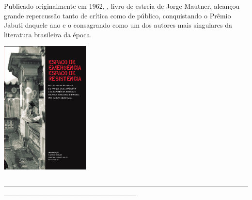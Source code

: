 \medskip

\noindent{}Publicado originalmente em 1962, {}, livro de estreia de Jorge Mautner, alcançou grande repercussão tanto de crítica como de público, conquistando o Prêmio Jabuti daquele ano e o consagrando como um dos autores mais singulares da literatura brasileira da época.

\vfill

\hspace*{-.4cm}\begin{minipage}[c]{0.90\linewidth}
\small{
{}}
\end{minipage}

\pagebreak

\hspace{.5cm}

\begin{center}
\hspace*{-2.5cm}
\hspace*{2cm}\includegraphics[width=45mm]{./imgs/lage.jpeg}
\end{center}

\hspace*{-2cm}\_\_\_\_\_\_\_\_\_\_\_\_\_\_\_\_\_\_\_\_\_\_\_\_\_\_\_\_\_\_\_\_\_\_\_\_\_\_\_\_\_\_\_\_\_\_\_\_\_\_\_\_\_\_\_\_\_\_\_\_\_\_\_\_\_\_\_\_\_\_\_\_\_\_

